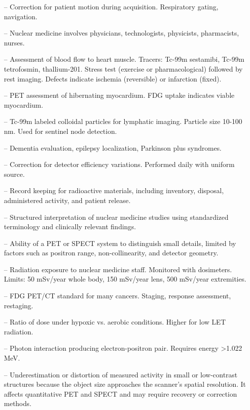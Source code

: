 -- Correction for patient motion during acquisition. Respiratory gating, navigation.


-- Nuclear medicine involves physicians, technologists, physicists, pharmacists, nurses.

-- Assessment of blood flow to heart muscle. Tracers: Tc-99m sestamibi, Tc-99m tetrofosmin, thallium-201. Stress test (exercise or pharmacological) followed by rest imaging. Defects indicate ischemia (reversible) or infarction (fixed).

-- PET assessment of hibernating myocardium. FDG uptake indicates viable myocardium.


-- Tc-99m labeled colloidal particles for lymphatic imaging. Particle size 10-100 nm. Used for sentinel node detection.

-- Dementia evaluation, epilepsy localization, Parkinson plus syndromes.

-- Correction for detector efficiency variations. Performed daily with uniform source.

-- Record keeping for radioactive materials, including inventory, disposal, administered activity, and patient release.

-- Structured interpretation of nuclear medicine studies using standardized terminology and clinically relevant findings.

-- Ability of a PET or SPECT system to distinguish small details, limited by factors such as positron range, non-collinearity, and detector geometry.

-- Radiation exposure to nuclear medicine staff. Monitored with dosimeters. Limits: 50 mSv/year whole body, 150 mSv/year lens, 500 mSv/year extremities.

-- FDG PET/CT standard for many cancers. Staging, response assessment, restaging.

-- Ratio of dose under hypoxic vs. aerobic conditions. Higher for low LET radiation.

-- Photon interaction producing electron-positron pair. Requires energy >1.022 MeV.

-- Underestimation or distortion of measured activity in small or low-contrast structures because the object size approaches the scanner’s spatial resolution. It affects quantitative PET and SPECT and may require recovery or correction methods.

